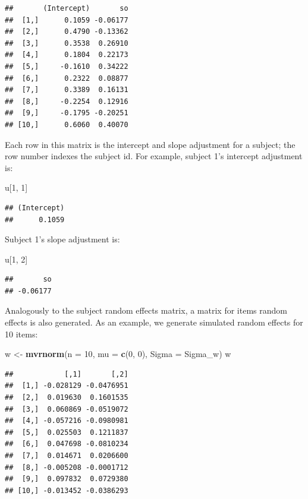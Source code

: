 \documentclass[12pt,]{krantz}
\newenvironment{Shaded}{\begin{snugshade}}{\end{snugshade}}
\newcommand{\DataTypeTok}[1]{\textcolor[rgb]{0.13,0.29,0.53}{#1}}
\newcommand{\DecValTok}[1]{\textcolor[rgb]{0.00,0.00,0.81}{#1}}
\newcommand{\KeywordTok}[1]{\textcolor[rgb]{0.13,0.29,0.53}{\textbf{#1}}}
\newcommand{\NormalTok}[1]{#1}
\newcommand{\StringTok}[1]{\textcolor[rgb]{0.31,0.60,0.02}{#1}}
\begin{document}
\begin{verbatim}
##       (Intercept)       so
##  [1,]      0.1059 -0.06177
##  [2,]      0.4790 -0.13362
##  [3,]      0.3538  0.26910
##  [4,]      0.1804  0.22173
##  [5,]     -0.1610  0.34222
##  [6,]      0.2322  0.08877
##  [7,]      0.3389  0.16131
##  [8,]     -0.2254  0.12916
##  [9,]     -0.1795 -0.20251
## [10,]      0.6060  0.40070
\end{verbatim}

Each row in this matrix is the intercept and slope adjustment for a subject; the row number indexes the subject id. For example, subject 1's intercept adjustment is:

\begin{Shaded}
\begin{Highlighting}[]
\NormalTok{u[}\DecValTok{1}\NormalTok{, }\DecValTok{1}\NormalTok{]}
\end{Highlighting}
\end{Shaded}

\begin{verbatim}
## (Intercept) 
##      0.1059
\end{verbatim}

Subject 1's slope adjustment is:

\begin{Shaded}
\begin{Highlighting}[]
\NormalTok{u[}\DecValTok{1}\NormalTok{, }\DecValTok{2}\NormalTok{]}
\end{Highlighting}
\end{Shaded}

\begin{verbatim}
##       so 
## -0.06177
\end{verbatim}

Analogously to the subject random effects matrix, a matrix for items random effects is also generated. As an example, we generate simulated random effects for 10 items:

\begin{Shaded}
\begin{Highlighting}[]
\NormalTok{w <-}\StringTok{ }\KeywordTok{mvrnorm}\NormalTok{(}\DataTypeTok{n =} \DecValTok{10}\NormalTok{, }\DataTypeTok{mu =} \KeywordTok{c}\NormalTok{(}\DecValTok{0}\NormalTok{, }\DecValTok{0}\NormalTok{), }\DataTypeTok{Sigma =}\NormalTok{ Sigma_w)}
\NormalTok{w}
\end{Highlighting}
\end{Shaded}

\begin{verbatim}
##            [,1]       [,2]
##  [1,] -0.028129 -0.0476951
##  [2,]  0.019630  0.1601535
##  [3,]  0.060869 -0.0519072
##  [4,] -0.057216 -0.0980981
##  [5,]  0.025503  0.1211837
##  [6,]  0.047698 -0.0810234
##  [7,]  0.014671  0.0206600
##  [8,] -0.005208 -0.0001712
##  [9,]  0.097832  0.0729380
## [10,] -0.013452 -0.0386293
\end{verbatim}
\end{document}
